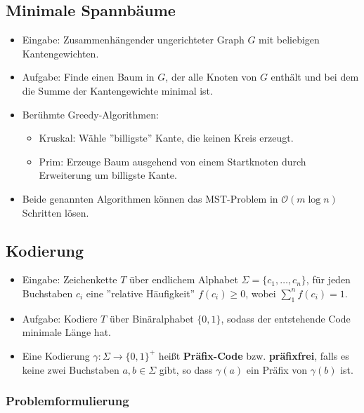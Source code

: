 \documentclass{scrartcl}
\begin{document}


\subsection{Minimale Spannbäume}

\begin{itemize}
	\item Eingabe: Zusammenhängender ungerichteter Graph $ G $ mit beliebigen Kantengewichten.
	\item Aufgabe: Finde einen Baum in $ G $, der alle Knoten von $ G $ enthält und bei dem die Summe der Kantengewichte minimal ist.
	\item Berühmte Greedy-Algorithmen:
	\begin{itemize}
		\item Kruskal: Wähle ''billigste'' Kante, die keinen Kreis erzeugt.
		\item Prim: Erzeuge Baum ausgehend von einem Startknoten durch Erweiterung um billigste Kante.
	\end{itemize}
	\item Beide genannten Algorithmen können das MST-Problem in $ \mathcal{O}(m \log n) $ Schritten lösen.
\end{itemize}

\subsection{Kodierung}

\begin{itemize}
	\item Eingabe: Zeichenkette $ T $ über endlichem Alphabet $ \Sigma = \{ c_1,\ldots,c_n \} $, für jeden Buchstaben $ c_i $ eine ''relative Häufigkeit'' $ f(c_i) \geq 0 $, wobei $ \sum_{1}^{n} f(c_i) = 1 $.
	\item Aufgabe: Kodiere $ T $ über Binäralphabet $ \{ 0,1 \} $, sodass der entstehende Code minimale Länge hat.
	\item Eine Kodierung $ \gamma: \Sigma \rightarrow \{ 0,1 \}^+ $ heißt \textbf{Präfix-Code} bzw. \textbf{präfixfrei}, falls es keine zwei Buchstaben $ a,b \in \Sigma $ gibt, so dass $ \gamma(a) $ ein Präfix von $ \gamma(b) $ ist.
\end{itemize}

\subsubsection{Problemformulierung}
\end{document}
